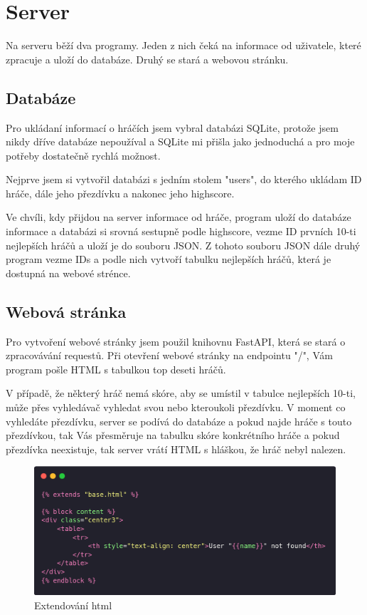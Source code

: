 \section{Server}
Na serveru běží dva programy. Jeden z nich čeká na informace od uživatele, které zpracuje a uloží do databáze. Druhý se stará a webovou stránku.

\subsection{Databáze}
Pro ukládaní informací o hráčích jsem vybral databázi SQLite, protože jsem nikdy dříve databáze nepoužíval a SQLite mi přišla jako jednoduchá a pro moje potřeby dostatečně rychlá možnost.

Nejprve jsem si vytvořil databázi s jedním stolem "users", do kterého ukládam ID hráče, dále jeho přezdívku a nakonec jeho highscore.

Ve chvíli, kdy přijdou na server informace od hráče, program uloží do databáze informace a databázi si srovná sestupně podle highscore, vezme ID prvních 10-ti nejlepších hráčů a uloží je do souboru JSON. Z tohoto souboru JSON dále druhý program vezme IDs a podle nich vytvoří tabulku nejlepších hráčů, která je dostupná na webové strénce.

\subsection{Webová stránka}
Pro vytvoření webové stránky jsem použil knihovnu FastAPI, která se stará o zpracovávání requestů. Při otevření webové stránky na endpointu "/", Vám program pošle HTML s tabulkou top deseti hráčů.

V případě, že některý hráč nemá skóre, aby se umístil v tabulce nejlepších 10-ti, může přes vyhledávač vyhledat svou nebo kteroukoli přezdívku. V moment co vyhledáte přezdívku, server se podívá do databáze a pokud najde hráče s touto přezdívkou, tak Vás přesměruje na tabulku skóre konkrétního hráče a pokud přezdívka neexistuje, tak server vrátí HTML s hláškou, že hráč nebyl nalezen. 

\begin{figure}[ht!]
    \centering
    \includegraphics[scale=0.3]{images/carbon (4).png}
    \caption{Extendování html}
\end{figure}

